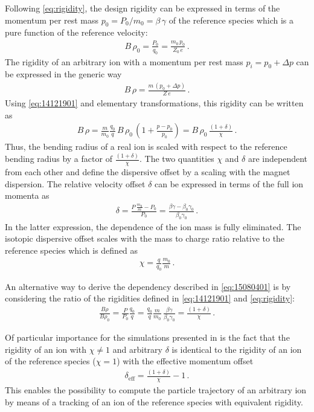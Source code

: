 Following \eqref{eq:rigidity}, the design rigidity can be expressed  in terms of the momentum per rest mass $p_0=P_0/m_0 = \beta \, \gamma$ of the reference species which is a pure function of the reference velocity:
\begin{align}
B \, \rho_0 = \frac{P_0}{q_0} = \frac{m_0 \, p_0}{Z_0 \, e} \, . \label{eq:14121901}
\end{align}
 The rigidity of an arbitrary ion with a momentum per rest mass $p_i = p_0 + \Delta p$ can be expressed in the generic way
\begin{align}
B\,\rho = \frac{m \, (p_0 + \Delta p)}{Z \, e} \, .
\end{align} 
Using \eqref{eq:14121901} and elementary transformations, this rigidity can be written as
\begin{align}
B \, \rho = \frac{m}{m_0} \frac{q_0}{q} \, B \, \rho_0 \, \left( 1 + \frac{p - p_0}{p_0} \right) =  B \, \rho_0 \, \frac{\left( 1 + \delta \right)}{\chi}  \, . \label{eq:15080401}
\end{align}
Thus, the bending radius of a real ion is scaled with respect to the reference bending radius by a factor of $\frac{(1+\delta)}{\chi}$. The two quantities $\chi$ and $\delta$ are independent from each other and define the dispersive offset by a scaling with the magnet dispersion. The relative velocity offset $\delta$ can be expressed in terms of the full ion momenta as
\begin{align}
\delta = \frac{P \, \frac{m_0}{m} - P_0}{P_0} = \frac{\beta \gamma - \beta_0 \gamma_0}{\beta_0 \gamma_0} \, . \label{eq:15010701}
\end{align}
In the latter expression, the dependence of the ion mass is fully eliminated. The isotopic dispersive offset scales with the mass to charge ratio relative to the reference species which is defined as
\begin{align}
\chi =  \frac{q}{q_0}  \frac{m_0}{m}\, .	\label{eq:chidef}
\end{align}

An alternative way to derive the dependency described in \eqref{eq:15080401} is by considering the ratio of the rigidities defined in \eqref{eq:14121901} and \eqref{eq:rigidity}:
\begin{align}
\frac{B \rho}{B \rho_0} = \frac{P}{P_0} \frac{q_0}{q} = \frac{q_0}{q} \frac{m}{m_0} \, \frac{\beta \gamma}{\beta_0 \gamma_0} = \frac{(1+\delta)}{\chi} \, . \label{eq:brho_brho0}
\end{align}

Of particular importance for the simulations presented in  is the fact that the rigidity of an ion with $\chi \neq 1$ and arbitrary $\delta$ is identical to the rigidity of an ion of the reference species ($\chi=1$) with the effective momentum offset
\begin{align}
\delta_\text{eff} = \frac{(1+\delta)}{\chi} -1 \,. \label{eq:d_effective}
\end{align}
This enables the possibility to compute the particle trajectory of an arbitrary ion by means of a tracking of an ion of the reference species with equivalent rigidity.

